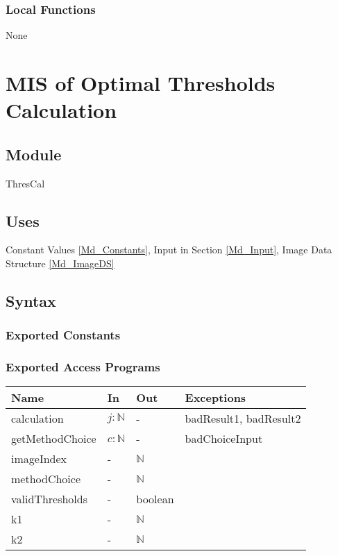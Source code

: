 \documentclass[12pt, titlepage]{article}
\begin{document}
\subsubsection{Local Functions}
None

\newpage

\section{MIS of Optimal Thresholds Calculation} \label{Md_Calculation}

\subsection{Module}

ThresCal

\subsection{Uses}

Constant Values \ref{Md_Constants}, Input in Section \ref{Md_Input}, Image Data
Structure \ref{Md_ImageDS}

\subsection{Syntax}

\subsubsection{Exported Constants}

\subsubsection{Exported Access Programs}

\begin{center}
\begin{tabular}{p{4cm} p{2cm} p{2cm} p{6cm}}
\hline
\textbf{Name} & \textbf{In} & \textbf{Out} & \textbf{Exceptions} \\
\hline
calculation & $j: \mathbb{N}$ & - & badResult1, badResult2\\
getMethodChoice & $c: \mathbb{N}$ & - & badChoiceInput \\
imageIndex & - & $\mathbb{N}$ &  \\
methodChoice & - & $\mathbb{N}$ &  \\
validThresholds & - & boolean &\\
k1 & - & $\mathbb{N}$ &  \\
k2 & - & $\mathbb{N}$ &  \\
\hline
\end{tabular}
\end{center}
\end{document}
